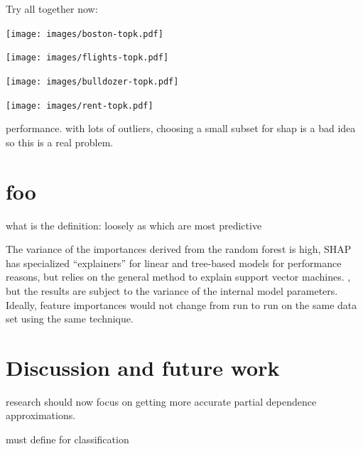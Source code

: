 \documentclass[12pt]{article}
\begin{document}
Try all together now:

\noindent \begin{minipage}[t]{0.5\textwidth}
\texttt{[image: images/boston-topk.pdf]}
\vspace{-3mm}
\label{fig:bigx_stratpd}
\end{minipage}
\begin{minipage}[t]{0.5\textwidth}
\texttt{[image: images/flights-topk.pdf]}
\vspace{-3mm}
\end{minipage}

\noindent \begin{minipage}[t]{0.5\textwidth}
\texttt{[image: images/bulldozer-topk.pdf]}
\vspace{-3mm}
\end{minipage}
\hfill
\begin{minipage}[t]{0.5\textwidth}
\texttt{[image: images/rent-topk.pdf]}
\vspace{-3mm}
\end{minipage}

performance. with lots of outliers, choosing a small subset for shap is a bad idea so this is a real problem.
 
\section{foo}

 what is the definition: loosely as which are most predictive

The variance of the importances derived from the random forest is high, SHAP has specialized ``explainers'' for linear and tree-based models for performance reasons, but relies on the general method to explain support vector machines. , but the results are subject to the variance of the internal model parameters.  Ideally, feature importances would not change from run to run on the same data set using the same technique.

\section{Discussion and future work}

research should now focus on getting more accurate partial dependence approximations.

must define for classification




\end{document}
